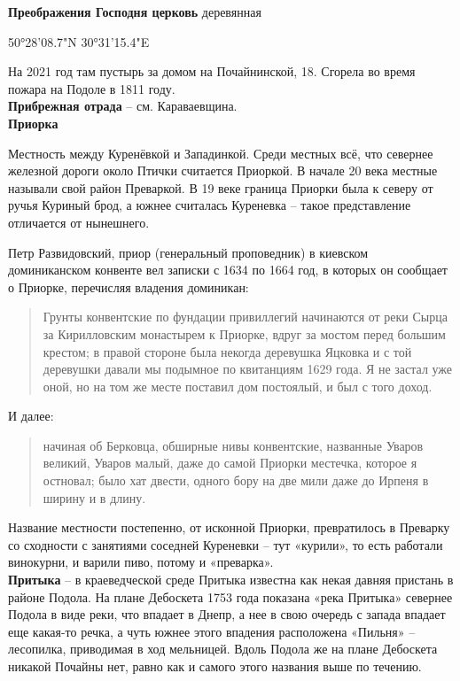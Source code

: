 

\textbf{Преображения Господня церковь} деревянная

50°28'08.7"N 30°31'15.4"E

На 2021 год там пустырь за домом на Почайнинской, 18. Сгорела во время пожара на Подоле в 1811 году.\\ 

\textbf{Прибрежная отрада} – см. Караваевщина.\\

\textbf{Приорка}

Местность между Куренёвкой и Западинкой. Среди местных всё, что севернее железной дороги около Птички считается Приоркой. В начале 20 века местные называли свой район Преваркой. В 19 веке граница Приорки была к северу от ручья Куриный брод, а южнее считалась Куреневка – такое представление отличается от нынешнего. 

Петр Развидовский, приор (генеральный проповедник) в киевском доминиканском конвенте вел записки с 1634 по 1664 год, в которых он сообщает о Приорке, перечисляя владения доминикан:

\begin{quotation}
Грунты конвентские по фундации привиллегий начинаются от реки Сырца за Кирилловским монастырем к Приорке, вдруг за мостом перед большим крестом; в правой стороне была некогда деревушка Яцковка и с той деревушки давали мы подымное по квитанциям 1629 года. Я не застал уже оной, но на том же месте поставил дом постоялый, и был с того доход.
\end{quotation}

И далее:

\begin{quotation}
начиная об Берковца, обширные нивы конвентские, названные Уваров великий, Уваров малый, даже до самой Приорки местечка, которое я остновал; было хат двести, одного бору на две мили даже до Ирпеня в ширину и в длину.
\end{quotation}

Название местности постепенно, от исконной Приорки, превратилось в Преварку со сходности с занятиями соседней Куреневки – тут «курили», то есть работали винокурни, и варили пиво, потому и «преварка».\\

\textbf{Притыка} – в краеведческой среде Притыка известна как некая давняя пристань в районе Подола. На плане Дебоскета 1753 года показана «река Притыка» севернее Подола в виде реки, что впадает в Днепр, а нее в свою очередь с запада впадает еще какая-то речка, а чуть южнее этого впадения расположена «Пильня» – лесопилка, приводимая в ход мельницей. Вдоль Подола же на плане Дебоскета никакой Почайны нет, равно как и самого этого названия выше по течению.\\ 

